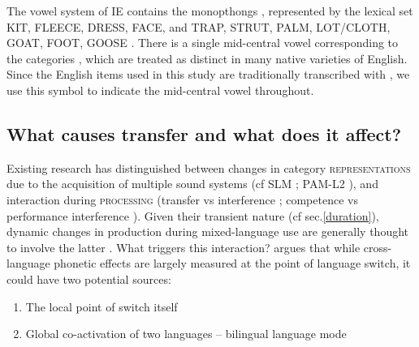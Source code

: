 \documentclass[charis,linguex]{glossa}
\newcommand{\nt}[1]{\textipa{[#1]}} %
\begin{document}
The vowel system of IE contains the monopthongs \nt{I, i, E, e, \ae, @/2, a:, O, o, U, u}, represented by the lexical set KIT, FLEECE, DRESS, FACE, and TRAP, STRUT, PALM, LOT/CLOTH, GOAT, FOOT, GOOSE \citep{wells1982accents, masica1972sound}. %
There is a single mid-central vowel corresponding to the categories \nt{2,@,3:}, which are treated as distinct in many native varieties of English. Since the English items used in this study are traditionally transcribed with \nt{2}, we use this symbol to indicate the mid-central vowel throughout. %
 

\subsection{What causes transfer and what does it affect?}

Existing research has distinguished between changes in category \textsc{representations} due to the acquisition of multiple sound systems (cf SLM \citep{flege1995second,flege2007language}; PAM-L2 \citep{best2007nonnative}), and interaction during \textsc{processing} (transfer vs interference \citep{grosjean2012attempt}; competence vs performance interference \citep{paradis1993linguistic}). 
Given their transient nature (cf sec.\ref{duration}), dynamic changes in production during mixed-language use are generally thought to involve the latter \citep{elias2017effects,simonet2014phonetic}. What triggers this interaction? \cite{olson2016role} argues that while cross-language phonetic effects are largely measured at the point of language switch, it could have two potential sources:
\begin{enumerate}
	\item The local point of switch itself
	\item Global co-activation of two languages -- bilingual language mode \citep{grosjean1998studying} 
\end{enumerate}
\end{document}
